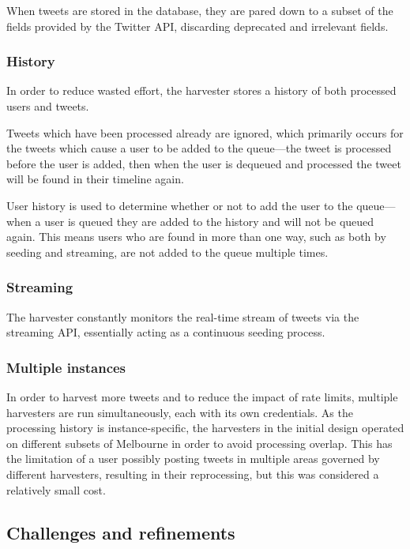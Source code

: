 When tweets are stored in the database, they are pared down to a subset of the fields provided by the Twitter API, discarding deprecated and irrelevant fields.

\subsubsection{History}

In order to reduce wasted effort, the harvester stores a history of both processed users and tweets.

Tweets which have been processed already are ignored, which primarily occurs for the tweets which cause a user to be added to the queue---the tweet is processed before the user is added, then when the user is dequeued and processed the tweet will be found in their timeline again.

User history is used to determine whether or not to add the user to the queue---when a user is queued they are added to the history and will not be queued again. This means users who are found in more than one way, such as both by seeding and streaming, are not added to the queue multiple times.

\subsubsection{Streaming}

The harvester constantly monitors the real-time stream of tweets via the streaming API, essentially acting as a continuous seeding process.

\subsubsection{Multiple instances}

In order to harvest more tweets and to reduce the impact of rate limits, multiple harvesters are run simultaneously, each with its own credentials. As the processing history is instance-specific, the harvesters in the initial design operated on different subsets of Melbourne in order to avoid processing overlap. This has the limitation of a user possibly posting tweets in multiple areas governed by different harvesters, resulting in their reprocessing, but this was considered a relatively small cost.

\subsection{Challenges and refinements}

